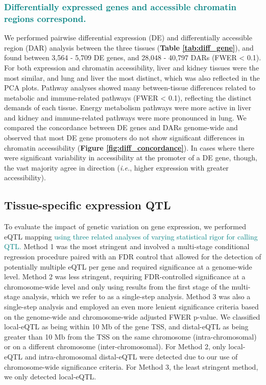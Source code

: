 \documentclass[9pt,twocolumn,twoside]{gsajnl}
\newcommand{\ie}{\emph{i.e.}\xspace}
\newcommand{\GKinline}[1]{\textcolor{teal}{#1}}
\begin{document}
\subsubsection{\GKinline{Differentially expressed genes and accessible chromatin regions correspond.}} We performed pairwise differential expression (DE) and differentially accessible region (DAR) analysis between the three tissues (\textbf{Table \ref{tab:diff_gene}}), and found between 3,564 - 5,709 DE genes, and 28,048 - 40,797 DARs (FWER < 0.1). For both expression and chromatin accessibility, liver and kidney tissues were the most similar, and lung and liver the most distinct, which was also reflected in the PCA plots. Pathway analyses showed many between-tissue differences related to metabolic and immune-related pathways (FWER < 0.1), reflecting the distinct demands of each tissue. Energy metabolism pathways were more active in liver and kidney and immune-related pathways were more pronounced in lung. We compared the concordance between DE genes and DARs genome-wide and observed that most DE gene promoters do not show significant differences in chromatin accessibility (\textbf{Figure \ref{fig:diff_concordance}}). In cases where there were significant variability in accessibility at the promoter of a DE gene, though, the vast majority agree in direction (\ie, higher expression with greater accessibility).

\subsection{Tissue-specific expression QTL}

To evaluate the impact of genetic variation on gene expression, we performed eQTL mapping \GKinline{using three related analyses of varying statistical rigor for calling QTL.}
Method 1 was the most stringent and involved a multi-stage conditional regression procedure paired with an FDR control that allowed for the detection of potentially multiple eQTL per gene and required significance at a genome-wide level.
Method 2 was less stringent, requiring FDR-controlled significance at a chromosome-wide level and only using results from the first stage of the multi-stage analysis, which we refer to as a single-step analysis. 
Method 3 was also a single-step analysis and employed an even more lenient significance criteria based on the genome-wide and chromosome-wide adjusted FWER p-value. 
We classified local-eQTL as being within 10 Mb of the gene TSS, and distal-eQTL as being greater than 10 Mb from the TSS on the same chromosome (intra-chromosomal) or on a different chromosome (inter-chromosomal). 
For Method 2, only local-eQTL and intra-chromosomal distal-eQTL were detected due to our use of chromosome-wide significance criteria. 
For Method 3, the least stringent method, we only detected local-eQTL.
\end{document}
